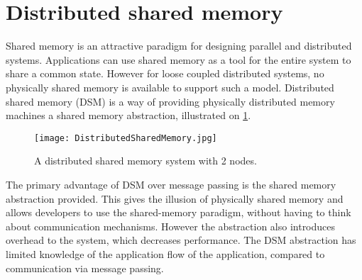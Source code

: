 

%
%



\section{Distributed shared memory}

Shared memory is an attractive paradigm for designing parallel and distributed systems. Applications can use shared memory as a tool for the entire system to share a common state. However for loose coupled distributed systems, no physically shared memory is available to support such a model. Distributed shared memory (DSM) is a way of providing physically distributed memory machines a shared memory abstraction, illustrated on \cref{fig:distributedSharedMemory}.

\begin{figure}
	\centering
	\texttt{[image: DistributedSharedMemory.jpg]} 
	\caption[Distributed Computing System with 2 nodes]{
		\label{fig:distributedSharedMemory} 
		\footnotesize{%
			A distributed shared memory system with 2 nodes.
		}
	}
\end{figure}

The primary advantage of DSM over message passing is the shared memory abstraction provided. This gives the illusion of physically shared memory and allows developers to use the shared-memory paradigm, without having to think about communication mechanisms. However the abstraction also introduces overhead to the system, which decreases performance. The DSM abstraction has limited knowledge of the application flow of the application, compared to communication via message passing. 
 
